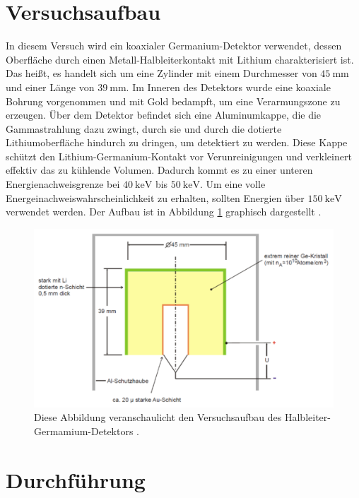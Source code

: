 \section{Versuchsaufbau}
In diesem Versuch wird ein koaxialer Germanium-Detektor verwendet,
dessen Oberfläche durch einen Metall-Halbleiterkontakt mit Lithium charakterisiert ist. Das heißt, es handelt 
sich um eine Zylinder mit einem Durchmesser von $\SI{45}{\milli\meter}$ und einer 
Länge von $\SI{39}{\milli\meter}$. 
Im Inneren des Detektors wurde eine koaxiale Bohrung vorgenommen und mit Gold 
bedampft, um eine Verarmungszone zu erzeugen. 
Über dem Detektor befindet sich eine Aluminumkappe, die die Gammastrahlung dazu zwingt, 
durch sie und durch die dotierte Lithiumoberfläche hindurch zu dringen, um detektiert zu werden.
Diese Kappe schützt den Lithium-Germanium-Kontakt vor Verunreinigungen und verkleinert 
effektiv das zu kühlende Volumen.
Dadurch kommt es zu einer unteren Energienachweisgrenze bei 
$\SI{40}{\kilo\electronvolt}$ bis $\SI{50}{\kilo\electronvolt}$.
Um eine volle Energeinachweiswahrscheinlichkeit zu erhalten, sollten  Energien über 
$\SI{150}{\kilo\electronvolt}$ verwendet werden. 
Der Aufbau ist in Abbildung \ref{abb1} graphisch dargestellt \cite{sample}.

\begin{figure}
    \centering
    \includegraphics[width=\textwidth]{figure/Aufbau.pdf}
    \caption{Diese Abbildung veranschaulicht den Versuchsaufbau des Halbleiter-Germamium-Detektors \cite{sample}.}
    \label{abb1}
\end{figure}



\section{Durchführung}
\label{sec:Durchführung}

